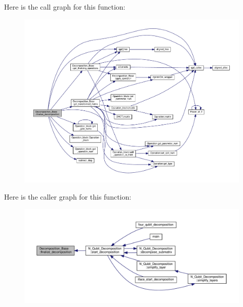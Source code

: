 Here is the call graph for this function\+:
\nopagebreak
\begin{figure}[H]
\begin{center}
\leavevmode
\includegraphics[width=350pt]{class_decomposition___base_a0cdd12741e72e2c074a188fe3867e6d5_cgraph}
\end{center}
\end{figure}




Here is the caller graph for this function\+:
\nopagebreak
\begin{figure}[H]
\begin{center}
\leavevmode
\includegraphics[width=350pt]{class_decomposition___base_a0cdd12741e72e2c074a188fe3867e6d5_icgraph}
\end{center}
\end{figure}


